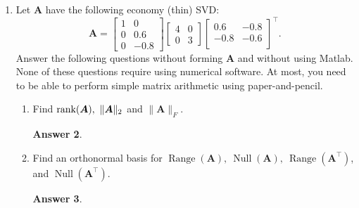 \documentclass{article}
\theoremstyle{definition}
\newtheorem*{answer}{Answer}
\newcommand{\mat}[1]{\bm{#1}}
\DeclareMathOperator{\range}{Range}
\DeclareMathOperator{\nullsp}{Null}
\begin{document}
\begin{enumerate}[leftmargin=\labelsep]
\begin{enumerate}
		      \item Using \(\mat{L}\) and \(\mat{U}\) from the earlier steps, solve the new system \(\mat{A}\tilde{x} = \tilde{b}\) where
		            \[
			            \tilde{b} =
			            \begin{bmatrix}
				            5 \\ 15 \\ 41 \\ 45
			            \end{bmatrix}.
		            \]
		            Do NOT perform the Gaussian elimination from scratch. You already have \(\mat{U}\) and \(\mat{L}\).
		            \begin{answer}

		            \end{answer}
	      \end{enumerate}

	\item Let \(\mat{A}\) have the following economy (thin) SVD:
	      \[
		      \mat{A} = \begin{bmatrix}
			      1 & 0    \\
			      0 & 0.6  \\
			      0 & -0.8
		      \end{bmatrix}
		      \begin{bmatrix}
			      4 & 0 \\
			      0 & 3
		      \end{bmatrix}
		      \begin{bmatrix}
			      0.6  & -0.8 \\
			      -0.8 & -0.6 \\
		      \end{bmatrix}^\top.
	      \]
	      Answer the following questions without forming \(\mat{A}\) and without using Matlab. None of these questions require using numerical software. At most, you need to be able to perform simple matrix arithmetic using paper-and-pencil.
	      \begin{enumerate}
		      \item Find \(\rank(\mat{A}),\ \|\mat{A}\|_2\) and \(\|\mat{A}\|_F\).
		            \begin{answer}

		            \end{answer}

		      \item Find an orthonormal basis for \(\range(\mat{A}),\ \nullsp(\mat{A}),\ \range(\mat{A}^\top)\), and \(\nullsp(\mat{A}^\top)\).
		            \begin{answer}


\end{answer}
\end{enumerate}
\end{enumerate}
\end{document}
